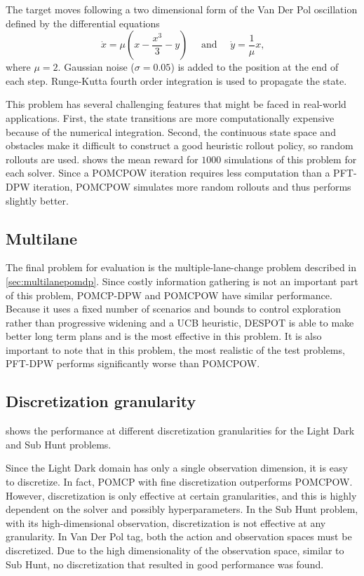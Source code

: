 The target moves following a two dimensional form of the Van Der Pol oscillation defined by the differential equations%
\begin{equation}
    \dot{x} = \mu \left( x - \frac{x^3}{3} -y \right) \quad \text{ and }\quad \dot{y} = \frac{1}{\mu}x\text{,} \nonumber
\end{equation}
where $\mu=2$.
Gaussian noise ($\sigma=0.05$) is added to the position at the end of each step.
Runge-Kutta fourth order integration is used to propagate the state.

This problem has several challenging features that might be faced in real-world applications.
First, the state transitions are more computationally expensive because of the numerical integration.
Second, the continuous state space and obstacles make it difficult to construct a good heuristic rollout policy, so random rollouts are used.
 shows the mean reward for $1000$ simulations of this problem for each solver.
Since a POMCPOW iteration requires less computation than a PFT-DPW iteration, POMCPOW simulates more random rollouts and thus performs slightly better.

\subsection{Multilane}

The final problem for evaluation is the multiple-lane-change problem described in \cref{sec:multilanepomdp}.
Since costly information gathering is not an important part of this problem, POMCP-DPW and POMCPOW have similar performance.
Because it uses a fixed number of scenarios and bounds to control exploration rather than progressive widening and a UCB heuristic, DESPOT is able to make better long term plans and is the most effective in this problem.
It is also important to note that in this problem, the most realistic of the test problems, PFT-DPW performs significantly worse than POMCPOW.

\subsection{Discretization granularity} \label{sec:discgran}

 shows the performance at different discretization granularities for the Light Dark and Sub Hunt problems.

Since the Light Dark domain has only a single observation dimension, it is easy to discretize.
In fact, POMCP with fine discretization outperforms POMCPOW.
However, discretization is only effective at certain granularities, and this is highly dependent on the solver and possibly hyperparameters.
In the Sub Hunt problem, with its high-dimensional observation, discretization is not effective at any granularity.
In Van Der Pol tag, both the action and observation spaces must be discretized.
Due to the high dimensionality of the observation space, similar to Sub Hunt, no discretization that resulted in good performance was found.


